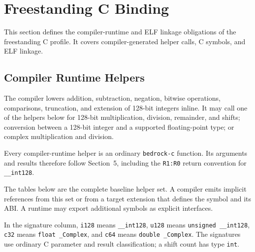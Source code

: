\documentclass[10pt,twoside]{article}
\begin{document}
\section{Freestanding C Binding}\label{page:freestanding-c-binding}
This section defines the compiler-runtime and ELF linkage obligations of the
freestanding C profile. It covers compiler-generated helper calls, C symbols,
and ELF linkage.

\subsection{Compiler Runtime Helpers}
The compiler lowers addition, subtraction, negation, bitwise operations,
comparisons, truncation, and extension of 128-bit integers inline. It may call
one of the helpers below for 128-bit multiplication,
division, remainder, and shifts; conversion between a 128-bit integer and a
supported floating-point type; or complex multiplication and division.

Every compiler-runtime helper is an ordinary \texttt{bedrock-c} function. Its
arguments and results therefore follow Section~5, including the
\texttt{R1:R0} return convention for \texttt{\_\_int128}.

The tables below are the complete baseline helper set. A compiler emits
implicit references from this set or from a target extension that defines the
symbol and its ABI. A runtime may export additional symbols as explicit
interfaces.

In the signature column, \texttt{i128} means \texttt{\_\_int128},
\texttt{u128} means \texttt{unsigned \_\_int128}, \texttt{c32} means
\texttt{float \_Complex}, and \texttt{c64} means
\texttt{double \_Complex}. The signatures use ordinary C parameter and result
classification; a shift count has type \texttt{int}.
\end{document}
